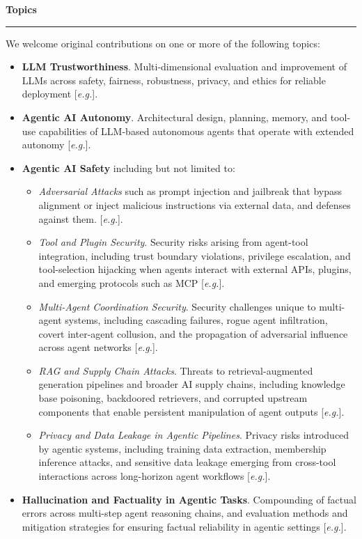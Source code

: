 \documentclass{article}
\newcommand{\eg}{\textit{e.g.}}
\newcommand{\sectiontitle}[1]{\noindent\textbf{\textcolor{neuripsblue}{#1}}\vspace{0.1cm}\hrule\vspace{0.2cm}}
\begin{document}
\sectiontitle{Topics}
\vspace{-2pt}
We welcome original contributions on one or more of the following topics:
\begin{itemize}[leftmargin=10pt,itemsep=1pt,topsep=2pt]
\item \textbf{LLM Trustworthiness}. Multi-dimensional evaluation and improvement of LLMs across safety, fairness, robustness, privacy, and ethics for reliable deployment [\eg \cite{wang2023decodingtrust, huang2024trustllm, wei2023jailbroken}].

\item \textbf{Agentic AI Autonomy}. Architectural design, planning, memory, and tool-use capabilities of LLM-based autonomous agents that operate with extended autonomy [\eg \cite{yao2023react, zhou2024webarena, yang2024sweagent}].

\item \textbf{Agentic AI Safety} including but not limited to:
\begin{itemize}[itemsep=1pt,topsep=0pt]
\item \textit{Adversarial Attacks} such as prompt injection and jailbreak that bypass alignment or inject malicious instructions via external data, and defenses against them. [\eg \cite{zou2023universal, liu2024autodan, chen2025struq}].

\item \textit{Tool and Plugin Security}. Security risks arising from agent-tool integration, including trust boundary violations, privilege escalation, and tool-selection hijacking when agents interact with external APIs, plugins, and emerging protocols such as MCP [\eg \cite{wu2025isolategpt, chen2025secalign}].

\item \textit{Multi-Agent Coordination Security}. Security challenges unique to multi-agent systems, including cascading failures, rogue agent infiltration, covert inter-agent collusion, and the propagation of adversarial influence across agent networks [\eg \cite{chen2024agentpoison, zhan2024injecagent}].

\item \textit{RAG and Supply Chain Attacks}. Threats to retrieval-augmented generation pipelines and broader AI supply chains, including knowledge base poisoning, backdoored retrievers, and corrupted upstream components that enable persistent manipulation of agent outputs [\eg \cite{zou2025poisonedrag}].

\item \textit{Privacy and Data Leakage in Agentic Pipelines}. Privacy risks introduced by agentic systems, including training data extraction, membership inference attacks, and sensitive data leakage emerging from cross-tool interactions across long-horizon agent workflows [\eg \cite{lukas2023analyzing, nasr2023scalable}].
\end{itemize}
\item \textbf{Hallucination and Factuality in Agentic Tasks}. Compounding of factual errors across multi-step agent reasoning chains, and evaluation methods and mitigation strategies for ensuring factual reliability in agentic settings [\eg \cite{min2023factscore}].


\end{itemize}
\end{document}
